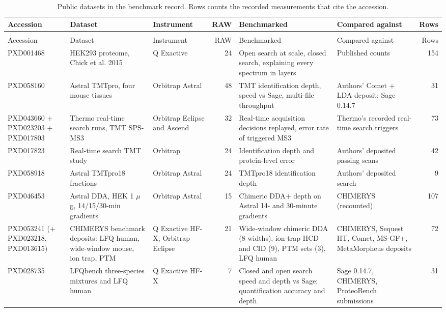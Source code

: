 \documentclass[10pt,a4paper]{article}
\begin{document}
{\scriptsize\setlength{\tabcolsep}{3pt}
\begin{longtable}{@{}>{\raggedright\arraybackslash}m{1.05in} >{\raggedright\arraybackslash}m{1.2in} >{\raggedright\arraybackslash}m{0.75in} r >{\raggedright\arraybackslash}m{1.4in} >{\raggedright\arraybackslash}m{1.2in} r@{}}
\caption{Public datasets in the benchmark record. Rows counts the recorded measurements that cite the accession.}\label{tab:cover}\\
\toprule
Accession & Dataset & Instrument & RAW & Benchmarked & Compared against & Rows\\ \midrule
\endfirsthead
\multicolumn{7}{@{}l}{\small\textit{Table~\ref{tab:cover}, continued}}\\ \toprule
Accession & Dataset & Instrument & RAW & Benchmarked & Compared against & Rows\\ \midrule
\endhead
\rowcolor{zebra}PXD001468 & HEK293 proteome, Chick et al. 2015 & Q Exactive & 24 & Open search at scale, closed search, explaining every spectrum in layers & Published counts & 154\\
PXD058160 & Astral TMTpro, four mouse tissues & Orbitrap Astral & 48 & TMT identification depth, speed vs Sage, multi-file throughput & Authors' Comet + LDA deposit; Sage 0.14.7 & 31\\
\rowcolor{zebra}PXD043660 + PXD023203 + PXD017803 & Thermo real-time search runs, TMT SPS-MS3 & Orbitrap Eclipse and Ascend & 32 & Real-time acquisition decisions replayed, error rate of triggered MS3 & Thermo's recorded real-time search triggers & 73\\
PXD017823 & Real-time search TMT study & Orbitrap & 24 & Identification depth and protein-level error & Authors' deposited passing scans & 42\\
\rowcolor{zebra}PXD058918 & Astral TMTpro18 fractions & Orbitrap Astral & 24 & TMTpro18 identification depth & Authors' deposited search & 9\\
PXD046453 & Astral DDA, HEK 1 \ensuremath{\mu}g, 14/15/30-min gradients & Orbitrap Astral & 15 & Chimeric DDA+ depth on Astral 14- and 30-minute gradients & CHIMERYS (recounted) & 107\\
\rowcolor{zebra}PXD053241 (+ PXD023218, PXD013615) & CHIMERYS benchmark deposits: LFQ human, wide-window mouse, ion trap, PTM & Q Exactive HF-X, Orbitrap Eclipse & 21 & Wide-window chimeric DDA (8 widths), ion-trap HCD and CID (9), PTM sets (3), LFQ human & CHIMERYS, Sequest HT, Comet, MS-GF+, MetaMorpheus deposits & 72\\
PXD028735 & LFQbench three-species mixtures and LFQ human & Q Exactive HF-X & 7 & Closed and open search speed and depth vs Sage; quantification accuracy and depth & Sage 0.14.7, CHIMERYS, ProteoBench submissions & 31\\

\end{longtable}}
\end{document}
